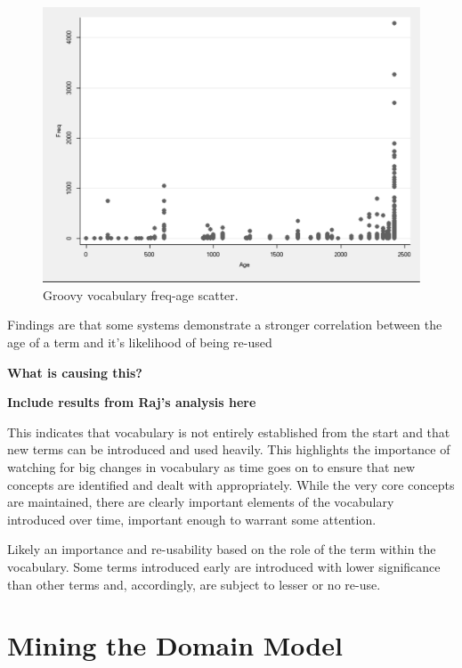 \begin{figure}[t]
\centering
\includegraphics[width=\textwidth]{Figures/Vocab-GroovyFrequencyAge.pdf}
\caption{Groovy vocabulary freq-age scatter.}
\label{fig:vocab-freqage-groovy}
\end{figure}


\crumbs
{
Findings are that some systems demonstrate a stronger correlation between the age of a term and it's likelihood of being re-used

\textbf{What is causing this?}

\textbf{Include results from Raj's analysis here}
}

This indicates that vocabulary is not entirely established from the start and that new terms can be introduced and used heavily. This highlights the importance of watching for big changes in vocabulary as time goes on to ensure that new concepts are identified and dealt with appropriately. While the very core concepts are maintained, there are clearly important elements of the vocabulary introduced over time, important enough to warrant some attention.

Likely an importance and re-usability based on the role of the term within the vocabulary. Some terms introduced early are introduced with lower significance than other terms and, accordingly, are subject to lesser or no re-use.


\section{Mining the Domain Model} %
\label{sec:mining_the_domain_model}

